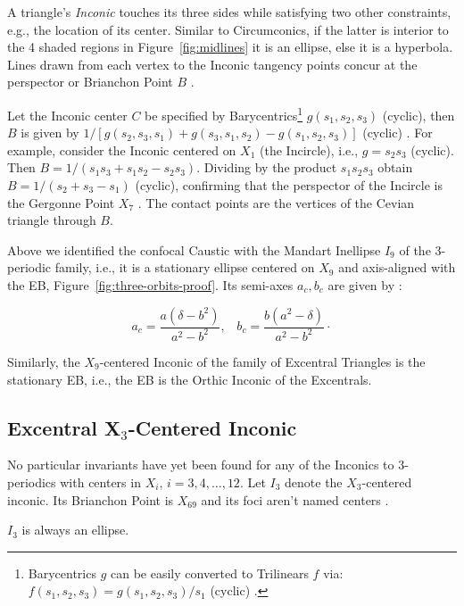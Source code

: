 A triangle's {\em Inconic} touches its three sides while satisfying two other constraints, e.g., the location of its center. Similar to Circumconics, if the latter is interior to the 4 shaded regions in  Figure~\ref{fig:midlines} it is an ellipse, else it is a hyperbola. Lines drawn from each vertex to the Inconic tangency points concur at the perspector or Brianchon Point $B$ \cite{mw}.

Let the Inconic center $C$ be specified by Barycentrics\footnote{Barycentrics $g$ can be easily converted to Trilinears $f$ via: $f(s_1,s_2,s_3)=g(s_1,s_2,s_3)/s_1$ (cyclic) \cite{yiu2003}.} $g(s_1,s_2,s_3)$ (cyclic), then $B$ is given by $1/[g(s_2,s_3,s_1)+g(s_3,s_1,s_2)-g(s_1,s_2,s_3)]$ (cyclic) \cite{stothers2001-circumconics}. For example, consider the Inconic centered on $X_1$ (the Incircle), i.e., $g=s_2 s_3$ (cyclic). Then $B=1/(s_1 s_3+s_1 s_2-s_2 s_3)$. Dividing by the product ${s_1}{s_2}{s_3}$ obtain $B=1/(s_2 + s_3 - s_1)$ (cyclic), confirming that the perspector of the Incircle is the Gergonne Point $X_7$ \cite[Perspector]{mw}. The contact points are the vertices of the Cevian triangle through $B$.

Above we identified the confocal Caustic with the Mandart Inellipse $I_9$ \cite{mw} of the 3-periodic family, i.e., it is a stationary ellipse centered on $X_9$ and axis-aligned with the EB, Figure~\ref{fig:three-orbits-proof}. Its semi-axes $a_c,b_c$ are given by \cite{garcia2019-incenter}:

\begin{equation*}
a_c=\frac{a\left(\delta-{b}^{2}\right)}{a^2-b^2},\;\;\;
b_c=\frac{b\left({a}^{2}-\delta\right)}{a^2-b^2}\cdot
\end{equation*}

Similarly, the $X_9$-centered Inconic of the family of Excentral Triangles is the stationary EB, i.e., the EB is the Orthic Inconic \cite{mw} of the Excentrals.

\subsection{Excentral X$_3$-Centered Inconic}

No particular invariants have yet been found for any of the Inconics to 3-periodics with centers in $X_i$, $i=3,4,\ldots,12$. Let $I_3$ denote the $X_3$-centered inconic. Its Brianchon Point is $X_{69}$ and its foci aren't named centers \cite{moses2020-private-circumconic}.

\begin{remark}
$I_3$ is always an ellipse.
\end{remark}

